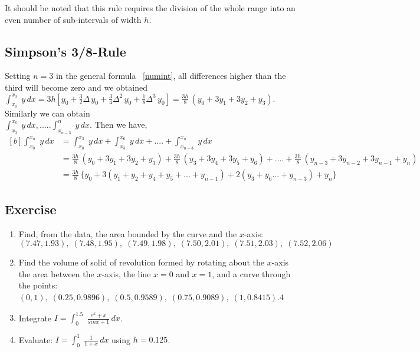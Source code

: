 \documentclass[aima203_lecturenotes_ku.tex]{subfiles}
\begin{document}
\begin{remark}
  It should be noted that this rule requires the division of the whole range into an even number of sub-intervals of width $h$.
\end{remark}

\subsection{Simpson's 3/8-Rule}
Setting $n=3$ in the general formula ~\ref{numint}, all differences higher than the third will become zero and we obtained \\[1mm]
$\displaystyle \int_{x_0}^{x_3} \; y\,dx = 3h \left [ y_0 + \frac{3}{2} \Delta \, y_0 + \frac{3}{4} \Delta^2 \, y_0 + \frac{1}{8} \Delta ^3 \, y_0 \right ] = \frac{3h}{8}\, (y_0 + 3y_1 + 3y_2+y_3).$ \\ Similarly we can obtain \\[5mm] $\int_{x_3}^{x_6} \; y\,dx, ..... \int_{x_{n-3}}^n \; y\,dx $. Then we have,
\begin{equation}
  \label{simp2}
  \begin{aligned}[b]
    \int_{x_0}^{x_n}\; y\,dx &= \int_{x_0}^{x_3} \; y\,dx + \int_{x_3}^{x_6} \; y\,dx + .... + \int_{x_{n-3}}^{x_n} \; y\,dx \\[1mm]
                             &= \frac{3h}{8} \, (y_0 +3y_1 + 3y_2 + y_3) + \frac{3h}{8} \, (y_3 + 3y_4 + 3y_5 + y_6) + .... + \frac{3h}{8} \, (y_{n-3} + 3y_{n-2} + 3y_{n-1} + y_n) \\[1mm]
                             &= \frac{3h}{8} \, \{ y_0 + 3(y_1 + y_2 + y_4 + y_5 + ... + y_{n-1}) + 2 (y_3 + y_6  ... + y_{n-3} ) + y_n \}
  \end{aligned}
\end{equation}

\subsection{Exercise}
\begin{enumerate}
\item Find, from the data, the area bounded by the curve and the $x$-axis: \\[1mm]
  $(7.47, 1.93), \; (7.48, 1.95),\; (7.49, 1.98),\; (7.50, 2.01),\; (7.51, 2.03),\; (7.52, 2.06)$

\item Find the volume of solid of revolution formed by rotating about the $x$-axis the area between the $x$-axis, the line $x=0$ and $x=1$, and a curve through the points: \\[1mm]
  $(0,1),\; (0.25,0.9896),\; (0.5,0.9589),\; (0.75,0.9089),\; (1,0.8415)$.4

\item Integrate $\displaystyle I = \int_0^{1.5}\; \frac{e^x +x}{sinx +1}\, dx$.

\item Evaluate: $\displaystyle I = \int_0^1 \; \frac{1}{1+x}\, dx$ using $h=0.125$.
\end{enumerate}
\end{document}
